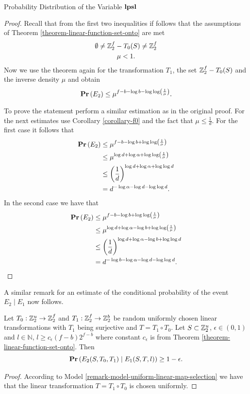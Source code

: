 \begin{section}{Probability Distribution of the Variable \texorpdfstring{$\mathbf{lpsl}$}{lpsl}}
\begin{proof}
Recall that from the first two inequalities if follows that the assumptions of Theorem \ref{theorem-linear-function-set-onto} are met
\begin{gather*}
\emptyset \neq \mathbb{Z}_{2}^{f} - T_0(S) \neq \mathbb{Z}_{2}^{f} \\
\mu < 1 \text{.}
\end{gather*}
Now we use the theorem again for the transformation $T_1$, the set $\mathbb{Z}_{2}^{f} - T_0(S)$ and the inverse density $\mu$ and obtain
\[
	\mathbf{Pr}\left(E_2\right) \leq \mu ^ {f - b - \log b - \log \log \left( \frac{1}{\mu} \right)} \text{.}
\]

To prove the statement perform a similar estimation as in the original proof. For the next estimates use Corollary \ref{corollary-f0} and the fact that $\mu \leq \frac{1}{d}$. For the first case it follows that
\[
\begin{split}
\mathbf{Pr}\left(E_2\right) 
	& \leq \mu ^ {f - b - \log b + \log \log \left( \frac{1}{\mu} \right)} \\
	& \leq \mu ^ {\log d + \log \alpha + \log \log \left( \frac{1}{\mu} \right)} \\
	& \leq \left(\frac{1}{d}\right) ^ {\log d + \log \alpha + \log \log d} \\
	& = d ^ {-\log \alpha - \log d - \log \log d} \text{.}
\end{split}
\]
In the second case we have that 
\[
\begin{split}
\mathbf{Pr}\left(E_2\right) 
	& \leq \mu ^ {f - b - \log b + \log \log \left( \frac{1}{\mu} \right)} \\
	& \leq \mu ^ {\log d + \log \alpha - \log b  + \log \log \left( \frac{1}{\mu} \right)} \\
	& \leq \left(\frac{1}{d}\right) ^ {\log d + \log \alpha - \log b + \log \log d} \\
	& = d ^ {- \log b -\log \alpha - \log d - \log \log d} \text{.}
\end{split}
\]
\end{proof}

A similar remark for an estimate of the conditional probability of the event $E_2 \mid E_1$ now follows.
\begin{remark}
\label{remark-prob-l-length-chain}
Let $T_0: \mathbb{Z}_{2}^{u} \rightarrow \mathbb{Z}_{2}^{f}$ and $T_1: \mathbb{Z}_{2}^{f} \rightarrow \mathbb{Z}_{2}^{b}$ be random uniformly chosen linear transformations with $T_1$ being surjective and $T = T_1 \circ T_0$. Let $S \subset \mathbb{Z}_{2}^{u}$, $\epsilon \in (0, 1)$ and $l \in \mathbb{N}$, $l \geq c_{\epsilon}(f - b)2 ^ {f - b}$ where constant $c_\epsilon$ is from Theorem \ref{theorem-linear-function-set-onto}. Then
\[
	\mathbf{Pr}\left(E_2(S, T_0, T_1) \mid E_1(S, T, l)\right) \geq 1 - \epsilon \text{.}
\]
\end{remark}
\begin{proof}
According to Model \ref{remark-model-uniform-linear-map-selection} we have that the linear transformation $T = T_1 \circ T_0$ is chosen uniformly.


\end{proof}
\end{section}
